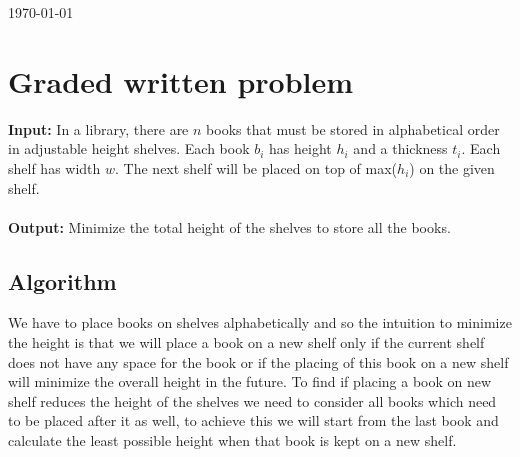 \documentclass[8pt]{article}
\begin{document}
\hfill \small{\today} \\
\setlength{\fboxrule}{.5mm}\setlength{\fboxsep}{1.2mm}
\newlength{\boxlength}\setlength{\boxlength}{\textwidth}
\addtolength{\boxlength}{-4mm}
\begin{center}\end{center}
\vspace{5mm}

\section{Graded written problem}

\textbf{Input:} In a library, there are $n$ books that must be stored in alphabetical order in adjustable height shelves. Each book $b_i$ has height $h_i$ and a thickness $t_i$. Each shelf has width $w$. The next shelf will be placed on top of max($h_i$) on the given shelf.
\\ \\
\textbf{Output:} Minimize the total height of the shelves to store all the books.

\subsection{Algorithm}
We have to place books on shelves alphabetically and so the intuition to minimize the height is that we will place a book on a new shelf only if the current shelf does not have any space for the book or if the placing of this book on a new shelf will minimize the overall height in the future. To find if placing a book on new shelf reduces the height of the shelves we need to consider all books which need to be placed after it as well, to achieve this we will start from the last book and calculate the least possible height when that book is kept on a new shelf.
\end{document}
